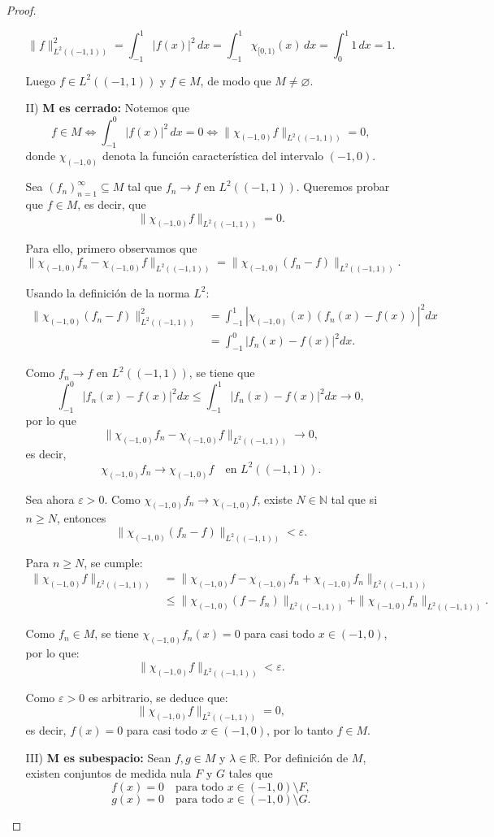 \begin{itemize}
\begin{proof}
\begin{enumerate}
\[
\|f\|_{L^2((-1,1))}^2 = \int_{-1}^{1} |f(x)|^2\, dx = \int_{-1}^{1} \chi_{[0,1)}(x)\, dx = \int_{0}^{1} 1\, dx = 1.
\]

Luego \( f \in L^2((-1,1)) \) y \( f \in M \), de modo que
$M \neq \varnothing$.
\item[II)] \textbf{M es cerrado:} Notemos que
\[
f \in M \iff \int_{-1}^{0} |f(x)|^2\, dx = 0 \iff \| \chi_{(-1,0)} f \|_{L^2((-1,1))} = 0,
\]
donde \( \chi_{(-1,0)} \) denota la función característica del intervalo \( (-1,0) \).

Sea \( (f_n)_{n=1}^\infty \subseteq M \) tal que \( f_n \to f \) en \( L^2((-1,1)) \). Queremos probar que \( f \in M \), es decir, que
\[
\| \chi_{(-1,0)} f \|_{L^2((-1,1))} = 0.
\]

Para ello, primero observamos que
\[
\| \chi_{(-1,0)} f_n - \chi_{(-1,0)} f \|_{L^2((-1,1))} = \| \chi_{(-1,0)} (f_n - f) \|_{L^2((-1,1))}.
\]

Usando la definición de la norma \( L^2 \):
\begin{align*}
\| \chi_{(-1,0)} (f_n - f) \|_{L^2((-1,1))}^2 &= \int_{-1}^{1} \left| \chi_{(-1,0)}(x) (f_n(x) - f(x)) \right|^2 dx \\
&= \int_{-1}^{0} |f_n(x) - f(x)|^2 dx.
\end{align*}

Como \( f_n \to f \) en \( L^2((-1,1)) \), se tiene que
\[
\int_{-1}^{0} |f_n(x) - f(x)|^2 dx \leq \int_{-1}^{1} |f_n(x) - f(x)|^2 dx \to 0,
\]
por lo que
\[
\| \chi_{(-1,0)} f_n - \chi_{(-1,0)} f \|_{L^2((-1,1))} \to 0,
\]
es decir,
\[
\chi_{(-1,0)} f_n \to \chi_{(-1,0)} f \quad \text{en } L^2((-1,1)).
\]

Sea ahora \( \varepsilon > 0 \). Como \( \chi_{(-1,0)} f_n \to \chi_{(-1,0)} f \), existe \( N \in \mathbb{N} \) tal que si \( n \geq N \), entonces
\[
\| \chi_{(-1,0)} (f_n - f) \|_{L^2((-1,1))} < \varepsilon.
\]

Para \( n \geq N \), se cumple:
\begin{align*}
\| \chi_{(-1,0)} f \|_{L^2((-1,1))} 
&= \| \chi_{(-1,0)} f - \chi_{(-1,0)} f_n + \chi_{(-1,0)} f_n \|_{L^2((-1,1))} \\
&\leq \| \chi_{(-1,0)} (f - f_n) \|_{L^2((-1,1))} + \| \chi_{(-1,0)} f_n \|_{L^2((-1,1))}.
\end{align*}

Como \( f_n \in M \), se tiene \( \chi_{(-1,0)} f_n(x) = 0 \) para casi todo $x\in (-1,0)$, por lo que:
\[
\| \chi_{(-1,0)} f \|_{L^2((-1,1))} < \varepsilon.
\]

Como \( \varepsilon > 0 \) es arbitrario, se deduce que:
\[
\| \chi_{(-1,0)} f \|_{L^2((-1,1))} = 0,
\]
es decir, \( f(x) = 0 \) para casi todo \( x \in (-1,0) \), por lo tanto \( f \in M \).
\item[III)] \textbf{M es subespacio:} Sean \( f, g \in M \) y \( \lambda \in \mathbb{R} \). Por definición de \( M \), existen conjuntos de medida nula \( F \) y \( G \) tales que
\[
f(x) = 0 \quad \text{para todo } x \in (-1,0) \setminus F,
\]
\[
g(x) = 0 \quad \text{para todo } x \in (-1,0) \setminus G.
\]


\end{enumerate}
\end{proof}
\end{itemize}
